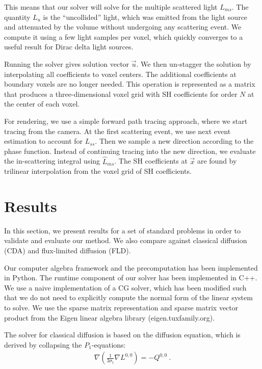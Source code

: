 \documentclass{egpubl}
\newcommand{\nocontentsline}[3]{}
\newcommand{\tocless}[2]{\bgroup\let\addcontentsline=\nocontentsline#1{#2}\egroup}
\begin{document}
This means that our solver will solve for the multiple scattered light $L_{ms}$. The quantity $L_u$ is the ``uncollided'' light, which was emitted from the light source and attenuated by the volume without undergoing any scattering event.
We compute it using a few light samples per voxel, which quickly converges to a useful result for Dirac delta light sources.

Running the solver gives solution vector $\vec{u}$. We then un-stagger the solution by interpolating all coefficients to voxel centers. The additional coefficients at boundary voxels are no longer needed. This operation is represented as a matrix that produces a three-dimensional voxel grid with SH coefficients for order $N$ at the center of each voxel.

For rendering, we use a simple forward path tracing approach, where we start tracing from the camera. At the first scattering event, we use next event estimation to account for $L_{ss}$. Then we sample a new direction according to the phase function. Instead of continuing tracing into the new direction, we evaluate the in-scattering integral using $\widehat{L}_{ms}$. The SH coefficients at $\vec{x}$ are found by trilinear interpolation from the voxel grid of SH coefficients.



\tocless\section{Results \label{sec:results}}

In this section, we present results for a set of standard problems in order to validate and evaluate our method. We also compare against classical diffusion (CDA) and flux-limited diffusion (FLD).

Our computer algebra framework and the precomputation has been implemented in Python. The runtime component of our solver has been implemented in C++. We use a naive implementation of a CG solver, which has been modified such that we do not need to explicitly compute the normal form of the linear system to solve. We use the sparse matrix representation and sparse matrix vector product from the Eigen linear algebra library (eigen.tuxfamily.org).

The solver for classical diffusion is based on the diffusion equation, which is derived by collapsing the $P_1$-equations:
\begin{align}
\nabla\left(\frac{1}{3\sigma_t}\nabla L^{0,0}\right)  = -Q^{0,0}
\ .
\label{eq:cda}
\end{align}
\end{document}
